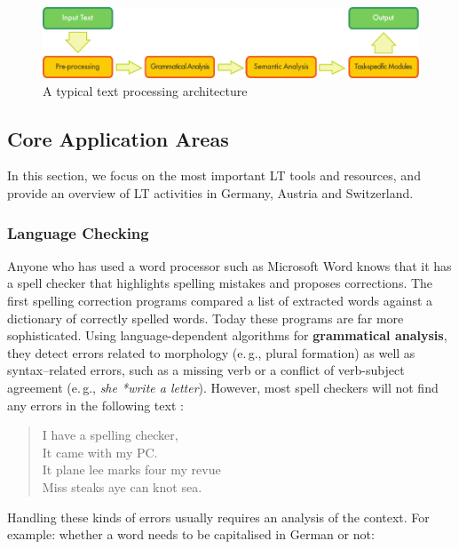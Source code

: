 \documentclass[]{../../metanetpaper}
\begin{document}
\begin{multicols}{2}
\begin{figure}[htb]
  \center
  \includegraphics[width=\textwidth]{../_media/english/text_processing_app_architecture}
  \caption{A typical text processing architecture}
  \label{fig:textprocessingarch_en}
\end{figure}

\subsection{Core Application Areas}

In this section, we focus on the most important LT tools and resources, and provide an overview of LT activities in Germany, Austria and Switzerland. 

\subsubsection{Language Checking}

Anyone who has used a word processor such as Microsoft Word knows that it has a spell checker that highlights spelling mistakes and proposes corrections. The first spelling correction programs compared a list of extracted words against a dictionary of correctly spelled words. Today these programs are far more sophisticated. Using language-dependent algorithms for \textbf{grammatical analysis}, they detect errors related to morphology (e.\,g., plural formation) as well as syntax–related errors, such as a missing verb or a conflict of verb-subject agreement (e.\,g., \textit{she *write a letter}). However, most spell checkers will not find any errors in the following text \cite{zar1}:

\begin{quote}
  I have a spelling checker,\\
  It came with my PC.\\
  It plane lee marks four my revue\\
  Miss steaks aye can knot sea.
\end{quote}

Handling these kinds of errors usually requires an analysis of the context. For example: whether a word needs to be capitalised in German or not:


\end{multicols}
\end{document}
